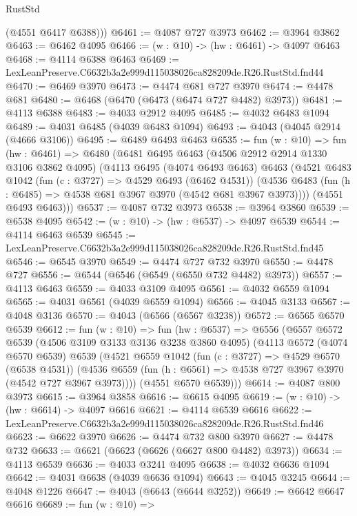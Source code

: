 \begin{lexlean}{RustStd}
\begin{coremodule}
        (@4551 @6417 @6388)))
@6461 := @4087 @727 @3973
@6462 := @3964 @3862
@6463 := @6462 @4095
@6466 := (w : @10) -> (hw : @6461) -> @4097 @6463
@6468 := @4114 @6388 @6463
@6469 := LexLeanPreserve.C6632b3a2e999d115038026ca828209de.R26.RustStd.fnd44
@6470 := @6469 @3970
@6473 := @4474 @681 @727 @3970
@6474 := @4478 @681
@6480 := @6468 (@6470 (@6473 (@6474 @727 @4482) @3973))
@6481 := @4113 @6388
@6483 := @4033 @2912 @4095
@6485 := @4032 @6483 @1094
@6489 := @4031 @6485 (@4039 @6483 @1094)
@6493 := @4043 (@4045 @2914 (@4666 @3106))
@6495 := @6489 @6493 @6463
@6535 := fun (w : @10) =>
  fun (hw : @6461) =>
  @6480
    (@6481
      @6495
      @6463
      (@4506 @2912 @2914 @1330 @3106 @3862 @4095)
      (@4113
        @6495
        (@4074 @6493 @6463)
        @6463
        (@4521
          @6483
          @1042
          (fun (c : @3727) => @4529 @6493 (@6462 @4531))
          (@4536 @6483 (fun (h : @6485) => @4538 @681 @3967 @3970 (@4542 @681 @3967 @3973))))
        (@4551 @6493 @6463)))
@6537 := @4087 @732 @3973
@6538 := @3964 @3860
@6539 := @6538 @4095
@6542 := (w : @10) -> (hw : @6537) -> @4097 @6539
@6544 := @4114 @6463 @6539
@6545 := LexLeanPreserve.C6632b3a2e999d115038026ca828209de.R26.RustStd.fnd45
@6546 := @6545 @3970
@6549 := @4474 @727 @732 @3970
@6550 := @4478 @727
@6556 := @6544 (@6546 (@6549 (@6550 @732 @4482) @3973))
@6557 := @4113 @6463
@6559 := @4033 @3109 @4095
@6561 := @4032 @6559 @1094
@6565 := @4031 @6561 (@4039 @6559 @1094)
@6566 := @4045 @3133
@6567 := @4048 @3136
@6570 := @4043 (@6566 (@6567 @3238))
@6572 := @6565 @6570 @6539
@6612 := fun (w : @10) =>
  fun (hw : @6537) =>
  @6556
    (@6557
      @6572
      @6539
      (@4506 @3109 @3133 @3136 @3238 @3860 @4095)
      (@4113
        @6572
        (@4074 @6570 @6539)
        @6539
        (@4521
          @6559
          @1042
          (fun (c : @3727) => @4529 @6570 (@6538 @4531))
          (@4536 @6559 (fun (h : @6561) => @4538 @727 @3967 @3970 (@4542 @727 @3967 @3973))))
        (@4551 @6570 @6539)))
@6614 := @4087 @800 @3973
@6615 := @3964 @3858
@6616 := @6615 @4095
@6619 := (w : @10) -> (hw : @6614) -> @4097 @6616
@6621 := @4114 @6539 @6616
@6622 := LexLeanPreserve.C6632b3a2e999d115038026ca828209de.R26.RustStd.fnd46
@6623 := @6622 @3970
@6626 := @4474 @732 @800 @3970
@6627 := @4478 @732
@6633 := @6621 (@6623 (@6626 (@6627 @800 @4482) @3973))
@6634 := @4113 @6539
@6636 := @4033 @3241 @4095
@6638 := @4032 @6636 @1094
@6642 := @4031 @6638 (@4039 @6636 @1094)
@6643 := @4045 @3245
@6644 := @4048 @1226
@6647 := @4043 (@6643 (@6644 @3252))
@6649 := @6642 @6647 @6616
@6689 := fun (w : @10) =>

\end{coremodule}
\end{lexlean}

